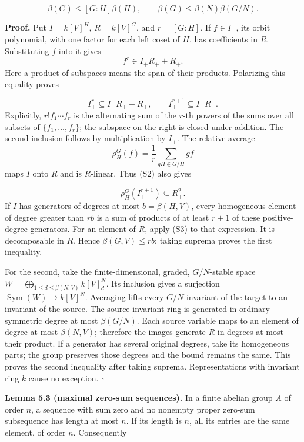 \documentclass[
]{article}
\begin{document}
\[
\beta(G)\leq [G:H]\beta(H),\qquad
\beta(G)\leq\beta(N)\beta(G/N).
\tag{S1}
\]

\textbf{Proof.} Put \(I=k [V]^H\), \(R=k [V]^G\), and \(r=[G:H]\). If
\(f\in I_+\), its orbit polynomial, with one factor for each left coset
of \(H\), has coefficients in \(R\). Substituting \(f\) into it gives \[
f^r\in I_+R_++R_+.
\] Here a product of subspaces means the span of their products.
Polarizing this equality proves
\protect{}\label{equation-S2}{}

\[
I_+^r\subseteq I_+R_++R_+,
\qquad I_+^{r+1}\subseteq I_+R_+.
\tag{S2}
\] Explicitly, \(r!f_1\cdots f_r\) is the alternating sum of the
\(r\)-th powers of the sums over all subsets of \(\{f_1,\ldots,f_r\}\);
the subspace on the right is closed under addition. The second inclusion
follows by multiplication by \(I_+\). The relative average \[
\rho_H^G(f)=\frac1r\sum_{gH\in G/H}g f
\] maps \(I\) onto \(R\) and is \(R\)-linear. Thus (S2) also gives
\protect{}\label{equation-S3}{}

\[
\rho_H^G(I_+^{r+1})\subseteq R_+^2.
\tag{S3}
\] If \(I\) has generators of degrees at most \(b=\beta(H,V)\), every
homogeneous element of degree greater than \(rb\) is a sum of products
of at least \(r+1\) of these positive-degree generators. For an element
of \(R\), apply (S3) to that expression. It is decomposable in \(R\).
Hence \(\beta(G,V)\leq rb\); taking suprema proves the first inequality.

For the second, take the finite-dimensional, graded, \(G/N\)-stable
space \(W=\bigoplus_{1\leq d\leq\beta(N,V)}k [V]^N_d\). Its inclusion
gives a surjection \(\operatorname{Sym}(W)\to k [V]^N\). Averaging lifts
every \(G/N\)-invariant of the target to an invariant of the source. The
source invariant ring is generated in ordinary symmetric degree at most
\(\beta(G/N)\). Each source variable maps to an element of degree at
most \(\beta(N,V)\); therefore the images generate \(R\) in degrees at
most their product. If a generator has several original degrees, take
its homogeneous parts; the group preserves those degrees and the bound
remains the same. This proves the second inequality after taking
suprema. Representations with invariant ring \(k\) cause no exception.
\(\square\)

\protect{}\label{lemma-5-3}{}

\textbf{Lemma 5.3 (maximal zero-sum sequences).} In a finite abelian
group \(A\) of order \(n\), a sequence with sum zero and no nonempty
proper zero-sum subsequence has length at most \(n\). If its length is
\(n\), all its entries are the same element, of order \(n\).
Consequently \protect{}\label{equation-S4}{}
\end{document}
